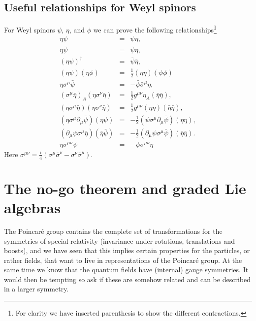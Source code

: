\documentclass[notes.tex]{subfiles}
\begin{document}
\subsection{Useful relationships for Weyl spinors}
\label{sec:Weylspinor_calc}
For Weyl spinors $\psi$, $\eta$, and $\phi$ we can prove the following relationships\footnote{For clarity we have inserted parenthesis to show the different contractions.} 
\begin{eqnarray}
\eta\psi 				&=& \psi\eta,  \label{eq:Weylspinor_etapsi}  \\
\bar\eta\bar\psi 			&=& \bar\psi\bar\eta,  \\
(\eta\psi)^\dagger 		&=& \bar\psi\bar\eta,  \\
(\eta\psi)(\eta\phi) 		&=& \frac{1}{2}(\eta\eta)(\psi\phi) \label{eq:Weylspinor_etapsietapsi}  \\
\eta\sigma^\mu\bar\psi 	&=& - \bar\psi\bar\sigma^\mu\eta,  \label{eq:Weylspinor_etasigmapsi} \\
(\sigma^\mu \bar{\eta})_A(\eta\sigma^\nu \bar{\eta})&=&\frac{1}{2}g^{\mu\nu}\eta_A(\bar{\eta}\bar{\eta}), \label{eq:Weylspinor_sigmaetaetasigmaeta}\\
(\eta\sigma^\mu \bar{\eta})(\eta\sigma^\nu \bar{\eta})&=&\frac{1}{2}g^{\mu\nu}(\eta\eta)(\bar{\eta}\bar{\eta}),   \label{eq:Weylspinor_etasigmamuetaetasigmanueta} \\
(\eta\sigma^\mu\partial_\mu \bar\psi )(\eta\psi) &=& -\frac{1}{2}(\psi\sigma^\mu\partial_\mu \bar\psi)(\eta\eta),\\
(\partial_\mu\psi\sigma^\mu \bar\eta)(\bar\eta\bar\psi) &=& -\frac{1}{2}(\partial_\mu\psi\sigma^\mu \bar\psi)(\bar\eta\bar\eta). \label{eq:Weylspinor_last} \\
\eta\sigma^{\mu\nu}\psi	&=&-\psi\sigma^{\mu\nu}\eta   \label{eq:Weylspinor_etasigmamunupsi} 
\end{eqnarray}
Here $\sigma^{\mu\nu} = \frac{i}{4}(\sigma^\mu \bar{\sigma}^\nu - \sigma^\nu \bar{\sigma}^\mu)$.



\section{The no-go theorem and graded Lie algebras}
The Poincaré group contains the complete set of transformations for the symmetries of special relativity (invariance under rotations, translations and boosts), and we have seen that this implies certain properties for the particles, or rather fields, that want to live in representations of the Poincaré group. At the same time we know that the quantum fields have (internal) gauge symmetries. It would then be tempting so ask if these are somehow related and can be described in a larger symmetry.
\end{document}
